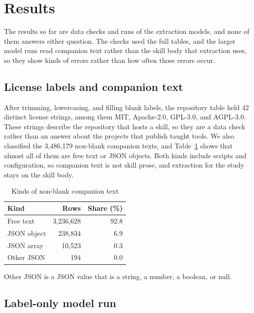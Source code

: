 \section{Results}
\label{sec:results}

The results so far are data checks and runs of the extraction models, and none of them answers either question.
The checks used the full tables, and the larger model runs read companion text rather than the skill body that extraction uses, so they show kinds of errors rather than how often those errors occur.

\subsection{License labels and companion text}

After trimming, lowercasing, and filling blank labels, the repository table held 42 distinct license strings, among them MIT, Apache-2.0, GPL-3.0, and AGPL-3.0.
These strings describe the repository that hosts a skill, so they are a data check rather than an answer about the projects that publish taught tools.
We also classified the 3{,}486{,}179 non-blank companion texts, and Table~\ref{tab:companion-kinds} shows that almost all of them are free text or JSON objects.
Both kinds include scripts and configuration, so companion text is not skill prose, and extraction for the study stays on the skill body.

\begin{table}[!t]
  \centering
  \caption{Kinds of non-blank companion text}
  \label{tab:companion-kinds}
  \begin{tabular}{lrr}
    \toprule
    Kind        & Rows          & Share (\%) \\
    \midrule
    Free text   & 3{,}236{,}628 & 92.8       \\
    JSON object & 238{,}834     & 6.9        \\
    JSON array  & 10{,}523      & 0.3        \\
    Other JSON  & 194           & 0.0        \\
    \bottomrule
  \end{tabular}

  \smallskip
  \footnotesize Other JSON is a JSON value that is a string, a number, a boolean, or null.
\end{table}

\subsection{Label-only model run}


